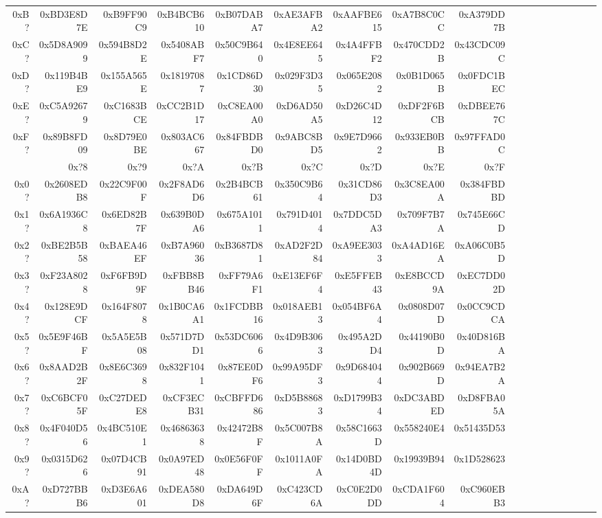 \begin{table}[h]
{\begin{tabular}{|r||r|r|r|r|r|r|r|r|r|r|r|r|r|r|r|r|r|}
    0xB? & 0xBD3E8D7E & 0xB9FF90C9 & 0xB4BCB610 & 0xB07DABA7 &
    0xAE3AFBA2 & 0xAAFBE615 & 0xA7B8C0CC & 0xA379DD7B \\
    0xC? & 0x5D8A9099 & 0x594B8D2E & 0x5408ABF7 & 0x50C9B640 &
    0x4E8EE645 & 0x4A4FFBF2 & 0x470CDD2B & 0x43CDC09C \\
    0xD? & 0x119B4BE9 & 0x155A565E & 0x18197087 & 0x1CD86D30 &
    0x029F3D35 & 0x065E2082 & 0x0B1D065B & 0x0FDC1BEC \\
    0xE? & 0xC5A92679 & 0xC1683BCE & 0xCC2B1D17 & 0xC8EA00A0 &
    0xD6AD50A5 & 0xD26C4D12 & 0xDF2F6BCB & 0xDBEE767C \\
    0xF? & 0x89B8FD09 & 0x8D79E0BE & 0x803AC667 & 0x84FBDBD0 &
    0x9ABC8BD5 & 0x9E7D9662 & 0x933EB0BB & 0x97FFAD0C \\
    \hline
    \hline
    & 0x?8 & 0x?9 & 0x?A & 0x?B & 0x?C & 0x?D & 0x?E & 0x?F \\
    \hline
    0x0? & 0x2608EDB8 & 0x22C9F00F & 0x2F8AD6D6 & 0x2B4BCB61 &
    0x350C9B64 & 0x31CD86D3 & 0x3C8EA00A & 0x384FBDBD \\
    0x1? & 0x6A1936C8 & 0x6ED82B7F & 0x639B0DA6 & 0x675A1011 &
    0x791D4014 & 0x7DDC5DA3 & 0x709F7B7A & 0x745E66CD \\
    0x2? & 0xBE2B5B58 & 0xBAEA46EF & 0xB7A96036 & 0xB3687D81 &
    0xAD2F2D84 & 0xA9EE3033 & 0xA4AD16EA & 0xA06C0B5D \\
    0x3? & 0xF23A8028 & 0xF6FB9D9F & 0xFBB8BB46 & 0xFF79A6F1 &
    0xE13EF6F4 & 0xE5FFEB43 & 0xE8BCCD9A & 0xEC7DD02D \\
    0x4? & 0x128E9DCF & 0x164F8078 & 0x1B0CA6A1 & 0x1FCDBB16 &
    0x018AEB13 & 0x054BF6A4 & 0x0808D07D & 0x0CC9CDCA \\
    0x5? & 0x5E9F46BF & 0x5A5E5B08 & 0x571D7DD1 & 0x53DC6066 &
    0x4D9B3063 & 0x495A2DD4 & 0x44190B0D & 0x40D816BA \\
    0x6? & 0x8AAD2B2F & 0x8E6C3698 & 0x832F1041 & 0x87EE0DF6 &
    0x99A95DF3 & 0x9D684044 & 0x902B669D & 0x94EA7B2A \\
    0x7? & 0xC6BCF05F & 0xC27DEDE8 & 0xCF3ECB31 & 0xCBFFD686 &
    0xD5B88683 & 0xD1799B34 & 0xDC3ABDED & 0xD8FBA05A \\
    0x8? & 0x4F040D56 & 0x4BC510E1 & 0x46863638 & 0x42472B8F &
    0x5C007B8A & 0x58C1663D & 0x558240E4 & 0x51435D53 \\
    0x9? & 0x0315D626 & 0x07D4CB91 & 0x0A97ED48 & 0x0E56F0FF &
    0x1011A0FA & 0x14D0BD4D & 0x19939B94 & 0x1D528623 \\
    0xA? & 0xD727BBB6 & 0xD3E6A601 & 0xDEA580D8 & 0xDA649D6F &
    0xC423CD6A & 0xC0E2D0DD & 0xCDA1F604 & 0xC960EBB3 \\

\end{tabular}}
\end{table}
